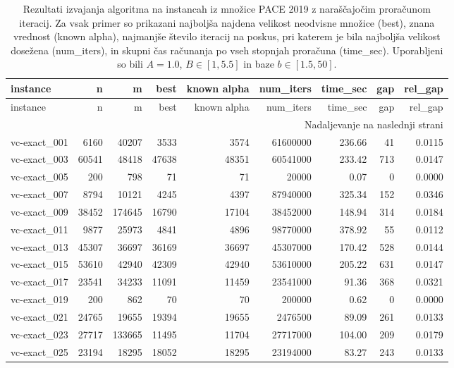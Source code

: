 {\setlength{\LTcapwidth}{\textwidth}
\begin{longtable}{lrrrrrrrr}
\caption{Rezultati izvajanja algoritma na instancah iz množice PACE 2019 z naraščajočim proračunom iteracij. Za vsak primer so prikazani najboljša najdena velikost neodvisne množice (best), znana vrednost (known alpha), najmanjše število iteracij na poskus, pri katerem je bila najboljša velikost dosežena (num\_iters), in skupni čas računanja po vseh stopnjah proračuna (time\_sec). Uporabljeni so bili $A = 1.0$, $B \in [1, 5.5]$ in baze $b \in [1.5, 50]$.} \label{tab:results_budget_tiers_PACE} \\
\toprule
instance & n & m & best & known alpha & num\_iters & time\_sec & gap & rel\_gap \\
\midrule
\endfirsthead
\toprule
instance & n & m & best & known alpha & num\_iters & time\_sec & gap & rel\_gap \\
\midrule
\endhead
\midrule
\multicolumn{9}{r}{Nadaljevanje na naslednji strani} \\
\endfoot
\bottomrule
\endlastfoot
vc-exact\_001 & 6160 & 40207 & 3533 & 3574 & 61600000 & 236.66 & 41 & 0.0115 \\
vc-exact\_003 & 60541 & 48418 & 47638 & 48351 & 60541000 & 233.42 & 713 & 0.0147 \\
vc-exact\_005 & 200 & 798 & 71 & 71 & 20000 & 0.07 & 0 & 0.0000 \\
vc-exact\_007 & 8794 & 10121 & 4245 & 4397 & 87940000 & 325.34 & 152 & 0.0346 \\
vc-exact\_009 & 38452 & 174645 & 16790 & 17104 & 38452000 & 148.94 & 314 & 0.0184 \\
vc-exact\_011 & 9877 & 25973 & 4841 & 4896 & 98770000 & 378.92 & 55 & 0.0112 \\
vc-exact\_013 & 45307 & 36697 & 36169 & 36697 & 45307000 & 170.42 & 528 & 0.0144 \\
vc-exact\_015 & 53610 & 42940 & 42309 & 42940 & 53610000 & 205.22 & 631 & 0.0147 \\
vc-exact\_017 & 23541 & 34233 & 11091 & 11459 & 23541000 & 91.36 & 368 & 0.0321 \\
vc-exact\_019 & 200 & 862 & 70 & 70 & 200000 & 0.62 & 0 & 0.0000 \\
vc-exact\_021 & 24765 & 19655 & 19394 & 19655 & 2476500 & 89.09 & 261 & 0.0133 \\
vc-exact\_023 & 27717 & 133665 & 11495 & 11704 & 27717000 & 104.00 & 209 & 0.0179 \\
vc-exact\_025 & 23194 & 18295 & 18052 & 18295 & 23194000 & 83.27 & 243 & 0.0133 \\

\end{longtable}}
